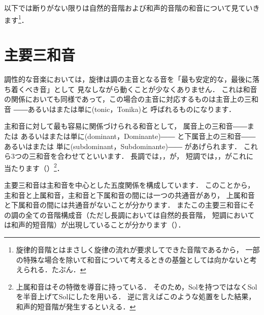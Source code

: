 \documentclass[dvipdfmx,uplatex,b5paper,openany,jbase=12Q,nomag*,textwidth-limit=44%
               ]{gachimuchi}
\begin{document}
以下では断りがない限りは自然的音階および和声的音階の和音について見ていきます\footnote{%
  旋律的音階とはまさしく旋律の流れが要求してできた音階であるから，
  一部の特殊な場合を除いて和音について考えるときの基盤としては向かないと考えられる．たぶん．
}．
\section{主要三和音}
調性的な音楽においては，旋律は調の主音となる音を「最も安定的な，最後に落ち着くべき音」として
見なしながら動くことが少なくありません．
これは和音の関係においても同様であって，この場合の主音に対応するものは主音上の三和音
――あるいはまたは単に\xkanjispace(tonic，Tonika)と
呼ばれるものになります．

主和音に対して最も容易に関係づけられる和音として，
属音上の三和音――または%
あるいはまたは単に\jghost(dominant，Dominante)――%
と下属音上の三和音――あるいはまたは
単に\jghost(subdominant，Subdominante)――%
があげられます．
これら3つの三和音を合わせてといいます．
長調では\Gni ，\Gniv ，\Gnv が，
短調では\Gni\Min ，\Gniv\Min ，\Gnv がこれに当たります（）\footnote{%
  上属和音はその特徴を導音に持っている．
  そのため，Solを持つ\Gnv\Min ではなくSolを半音上げてSol\aSharp にした\Gnv を用いる．
  逆に言えばこのような処置をした結果，和声的短音階が発生するといえる．
}．

\begin{Music}[0.6\linewidth]
  \nostartrule%
  \Startpiece%
  \Notes{}%
  \zchordsl{\Gni}%
  \zchordsl{\Gniv}%
  \zchordsl{\Gnv}%
  \en%
  \changecontext%
  \Notes{}%
  \zchordsl{\Gni\Min}%
  \zchordsl{\Gniv\Min}%
  \zchordsl{\Gnv}%
  \en%
  \endpiece%
\end{Music}

主要三和音は主和音を中心とした五度関係を構成しています．
このことから，主和音と上属和音，主和音と下属和音の間には一つの共通音があり，
上属和音と下属和音の間には共通音がないことが分かります．
またこの主要三和音にその調の全ての音階構成音（ただし長調においては自然的長音階，
短調においては和声的短音階）が出現していることが分かります（）．
\end{document}
